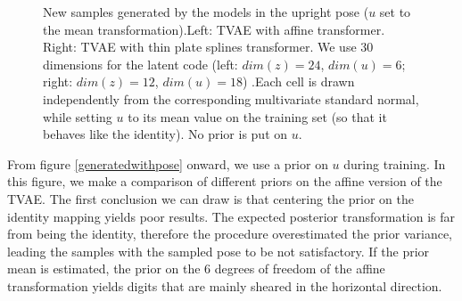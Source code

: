 \documentclass[letterpaper, twoside]{article}
\begin{document}
\begin{figure}[h]
\begin{minipage}{.5\textwidth}
\begin{tabular}{|@{}c@{}|}
\end{tabular}
\end{minipage}%
\caption{New samples generated by the models in the upright pose ($u$ set to the mean transformation).Left: TVAE with affine transformer. Right: TVAE with thin plate splines transformer. We use 30 dimensions for the latent code (left: $dim(z) = 24$, $dim(u) = 6$; right: $dim(z) = 12$, $dim(u) = 18$) .Each cell is drawn independently from the corresponding multivariate standard normal, while setting $u$ to its mean value on the training set (so that it behaves like the identity). No prior is put on $u$.}
\label{generatedafftps}
\end{figure}



  From figure \ref{generatedwithpose} onward, we use a prior on $u$ during training. In this figure, we make a comparison of different priors on the affine version of the TVAE. The first conclusion we can draw is that centering the prior on the identity mapping yields poor results. The expected posterior transformation is far from being the identity, therefore the procedure overestimated the prior variance, leading the samples with the sampled pose to be not satisfactory. If the prior mean is estimated, the prior on the 6 degrees of freedom of the affine transformation yields digits that are mainly sheared in the horizontal direction.\\
\end{document}

